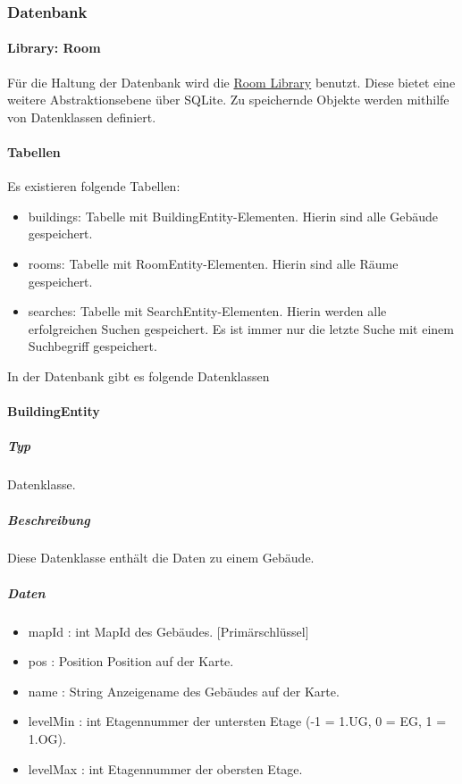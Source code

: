 \subsubsection{Datenbank}
\paragraph{Library: Room}
Für die Haltung der Datenbank wird die \href{https://developer.android.com/training/data-storage/room}
{Room Library} benutzt. Diese bietet eine weitere Abstraktionsebene über SQLite.
Zu speichernde Objekte werden mithilfe von Datenklassen definiert.

\paragraph{Tabellen}
Es existieren folgende Tabellen:
\begin{itemize}
    \item buildings: Tabelle mit BuildingEntity-Elementen. Hierin sind alle Gebäude gespeichert.
    \item rooms: Tabelle mit RoomEntity-Elementen. Hierin sind alle Räume gespeichert.
    \item searches: Tabelle mit SearchEntity-Elementen. Hierin werden alle erfolgreichen Suchen gespeichert. 
    Es ist immer nur die letzte Suche mit einem Suchbegriff gespeichert.
\end{itemize}

In der Datenbank gibt es folgende Datenklassen

\paragraph{BuildingEntity}
\subparagraph*{Typ}
Datenklasse.
\subparagraph*{Beschreibung}
Diese Datenklasse enthält die Daten zu einem Gebäude.
\subparagraph*{Daten}
\begin{itemize}
    \item mapId : int MapId des Gebäudes. [Primärschlüssel]
    \item pos : Position Position auf der Karte.
    \item name : String Anzeigename des Gebäudes auf der Karte.
    \item levelMin : int Etagennummer der untersten Etage (-1 = 1.UG, 0 = EG, 1 = 1.OG).
    \item levelMax : int Etagennummer der obersten Etage.
\end{itemize}

